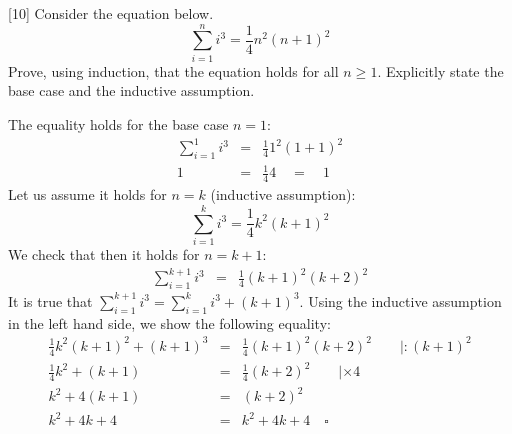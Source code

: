 \documentclass[addpoints,a4]{exam} %
\begin{document}
\begin{questions}



\clearpage
{}[10] 
Consider the equation below.
\begin{equation*}
\sum_{i=1}^{n}i^3 = \frac{1}{4}n^2(n+1)^2
\end{equation*}
Prove, using induction, that the equation holds for all $n \geq 1$. Explicitly state the base case and the inductive assumption.
\begin{solution}[\stretch{0.5}]
The equality holds for the base case $n=1$:
\begin{eqnarray*}
\sum_{i=1}^{1}i^3 & = & \frac{1}{4}1^2(1+1)^2\\
1 & = & \frac{1}{4}4 \quad = \quad 1
\end{eqnarray*}
Let us assume it holds for $n=k$ (inductive assumption):
\begin{equation*}
\sum_{i=1}^{k}i^3 = \frac{1}{4}k^2(k+1)^2
\end{equation*}
We check that then it holds for $n=k+1$:
\begin{eqnarray*}
\sum_{i=1}^{k+1}i^3 & = & \frac{1}{4}(k+1)^2(k+2)^2
\end{eqnarray*}
It is true that $\sum_{i=1}^{k+1}i^3  =  \sum_{i=1}^{k}i^3 + (k+1)^3$. Using the inductive assumption in the left hand side, we show the following equality:
\begin{eqnarray*}
\frac{1}{4}k^2(k+1)^2 + (k+1)^3 & = & \frac{1}{4}(k+1)^2(k+2)^2 \qquad | :(k+1)^2 \\
\frac{1}{4}k^2 + (k+1) & = & \frac{1}{4}(k+2)^2 \qquad | \times 4 \\
k^2 + 4(k+1) & = & (k+2)^2 \\
k^2 + 4k + 4 & = & k^2 + 4k + 4 \quad\square
\end{eqnarray*}
\end{solution}



\end{questions}
\end{document}
